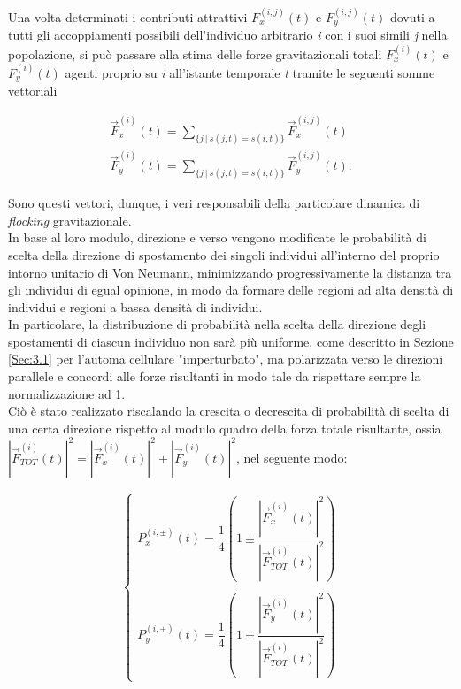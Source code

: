 \documentclass[letterpaper,10pt]{article}
\begin{document}
Una volta determinati i contributi attrattivi $F_x^{(i,j)}(t)$ e $F_y^{(i,j)}(t)$ dovuti a tutti gli accoppiamenti possibili dell'individuo arbitrario \textit{i} con i suoi simili \textit{j} nella popolazione, si può passare alla stima delle forze gravitazionali totali $F_x^{(i)}(t)$ e $F_y^{(i)}(t)$ agenti proprio su \textit{i} all'istante temporale \textit{t} tramite le seguenti somme vettoriali

\begin{equation}
\begin{aligned}
    \vec{F}_x^{(i)}(t) = \sum_{ \{ j \ | \ s(j,t)=s(i,t) \} } \vec{F}_x^{(i,j)}(t) \\
    \vec{F}_y^{(i)}(t) = \sum_{ \{ j \ | \ s(j,t)=s(i,t) \} } \vec{F}_y^{(i,j)}(t).
\end{aligned}
\label{Eq:7}
\end{equation}

Sono questi vettori, dunque, i veri responsabili della particolare dinamica di \textit{flocking} gravitazionale.
\\ In base al loro modulo, direzione e verso vengono modificate le probabilità di scelta della direzione di spostamento dei singoli individui all'interno del proprio intorno unitario di Von Neumann, minimizzando progressivamente la distanza tra gli individui di egual opinione, in modo da formare delle regioni ad alta densità di individui e regioni a bassa densità di individui. 
\\ In particolare, la distribuzione di probabilità nella scelta della direzione degli spostamenti di ciascun individuo non sarà più uniforme, come descritto in Sezione \ref{Sec:3.1} per l'automa cellulare "imperturbato", ma polarizzata verso le direzioni parallele e concordi alle forze risultanti in modo tale da rispettare sempre la normalizzazione ad 1.
\\ Ciò è stato realizzato riscalando la crescita o decrescita di probabilità di scelta di una certa direzione rispetto al modulo quadro della forza totale risultante, ossia $|\vec{F}_{TOT}^{(i)}(t)|^2 =|\vec{F}_x^{(i)}(t)|^2+|\vec{F}_y^{(i)}(t)|^2$, nel seguente modo:

\begin{equation}
\begin{aligned}
\begin{cases}
P_x^{(i, \pm)}(t) = \dfrac{1}{4} \left ( 1 \pm \dfrac{|\vec{F}_x^{(i)}(t)|^2}{|\vec{F}_{TOT}^{(i)}(t)|^2} \right ) \\ \\
P_y^{(i, \pm)}(t) = \dfrac{1}{4} \left ( 1 \pm \dfrac{|\vec{F}_y^{(i)}(t)|^2}{|\vec{F}_{TOT}^{(i)}(t)|^2} \right )
\end{cases}
\end{aligned}
\label{Eq:8}
\end{equation}
\end{document}
